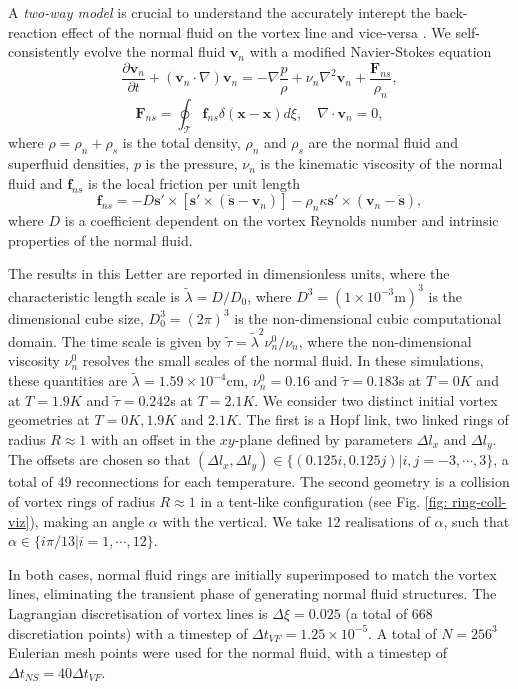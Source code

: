 \documentclass[%
superscriptaddress,
 amsmath,amssymb,
prl,
prb,
]{revtex4-2}
\def \s{\mathbf{s}}
\def \v{\mathbf{v}}
\def \x{\mathbf{x}}
\begin{document}
A \emph{two-way model} is crucial to understand the accurately interept the back-reaction effect of the normal fluid on the vortex line and vice-versa \cite{stasiakCrossComponentEnergyTransfer2024}. We self-consistently evolve the normal fluid $\v_n$ with a modified Navier-Stokes equation
\begin{equation}
	\frac{\partial \v_n}{\partial t} + (\v_n\cdot\nabla)\v_n = -\nabla\frac{p}{\rho} + \nu_n\nabla^2\v_n + \frac{\mathbf{F}_{ns}}{\rho_n},
\end{equation}
\begin{equation}
	\mathbf{F}_{ns} = \oint_{\mathcal{T}}\mathbf{f}_{ns}\delta(\x-\x)d\xi, \quad \nabla\cdot\v_n=0,
\end{equation}
where $\rho=\rho_n + \rho_s$ is the total density, $\rho_n$ and $\rho_s$ are the normal fluid and superfluid densities, $p$ is the pressure, $\nu_n$ is the kinematic viscosity of the normal fluid and $\mathbf{f}_{ns}$ is the local friction per unit length \cite{galantucciCoupledNormalFluid2015a}
\begin{equation}
	\mathbf{f}_{ns} = -D\s'\times\left[\s'\times(\dot{\s}-\v_n)\right]-\rho_n\kappa\s'\times(\v_n-\dot{\s}), 
\end{equation}
where $D$ is a coefficient dependent on the vortex Reynolds number and intrinsic properties of the normal fluid.

The results in this Letter are reported in dimensionless units, where the characteristic length scale is $\tilde{\lambda}=D/D_0$, where $D^3=(1\times10^{-3}\text{m})^3$ is the dimensional cube size, $D_0^3=(2\pi)^3$ is the non-dimensional cubic computational domain. The time scale is given by $\tilde{\tau} = \tilde{\lambda}^2\nu_n^0/\nu_n$, where the non-dimensional viscosity $\nu_n^0$ resolves the small scales of the normal fluid. In these simulations, these quantities are $\tilde{\lambda}=1.59\times10^{-4}\text{cm}$, $\nu_n^0=0.16$ and $\tilde{\tau} = 0.183$s at $T=0K$ and at $T=1.9K$ and $\tilde{\tau}=0.242$s at $T=2.1K$.
We consider two distinct initial vortex geometries at $T=0K,1.9K$ and $2.1K$. The first is a Hopf link, two linked rings of radius $R\approx1$ with an offset in the $xy$-plane defined by parameters $\Delta l_x$ and $\Delta l_y$. The offsets are chosen so that $(\Delta l_x, \Delta l _y) \in \lbrace(0.125i,0.125j)|i,j=-3,\cdots,3 \rbrace$, a total of 49 reconnections for each temperature. The second geometry is a collision of vortex rings of radius $R\approx1$ in a tent-like configuration (see Fig. \ref{fig: ring-coll-viz}), making an angle $\alpha$ with the vertical. We take 12 realisations of $\alpha$, such that $\alpha\in\lbrace i\pi/13|i=1,\cdots,12\rbrace$. 

In both cases, normal fluid rings are initially superimposed to match the vortex lines, eliminating the transient phase of generating normal fluid structures. The Lagrangian discretisation of vortex lines is $\Delta\xi=0.025$ (a total of 668 discretiation points) with a timestep of $\Delta t_{VF}=1.25\times10^{-5}$. A total of $N=256^3$ Eulerian mesh points were used for the normal fluid, with a timestep of $\Delta t_{NS} = 40\Delta t_{VF}$.

\end{document}
